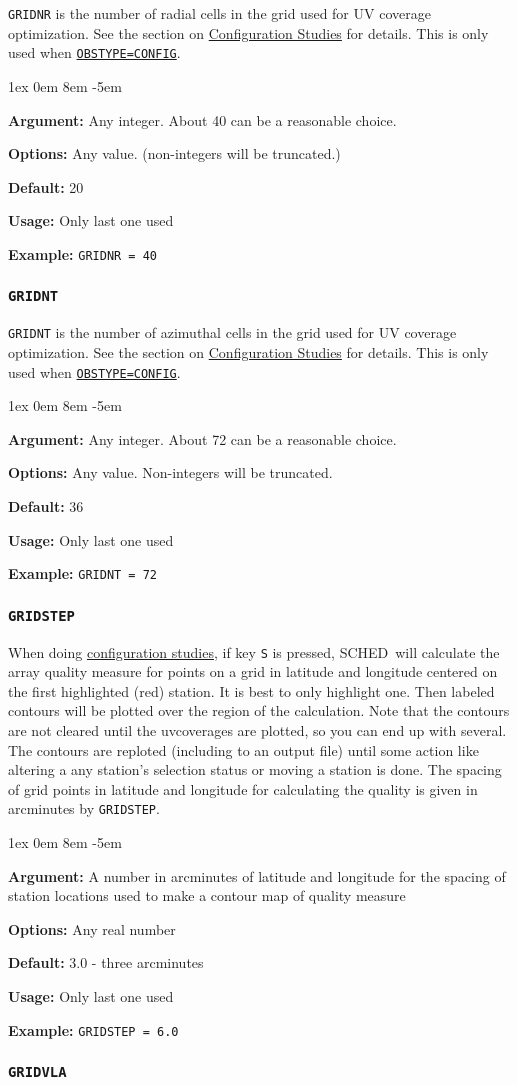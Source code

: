 \documentclass{report}
\newcommand{\schedb}{{\sc SCHED~}}
\newcommand{\rcwbox}[5]{
  \begin{list}{}{\parsep 1ex  \itemsep 0em
                 \leftmargin 8em  \itemindent -5em }
    \item {\bf Argument:} #1
    \item {\bf Options:}  #2
    \item {\bf Default:}  #3
    \item {\bf Usage:}    #4
    \item {\bf Example:}  #5
  \end{list}
}
\begin{document}
{\tt GRIDNR} is the number of radial cells in the grid used for UV
coverage optimization.  See the section on 
{\hyperref[SEC:CONFIG]{Configuration Studies}}
for details. This is only used when
{\hyperref[MP:OBSTYPE]{{\tt OBSTYPE=CONFIG}}}.

\rcwbox
{Any integer.  About 40 can be a reasonable choice.}
{Any value. (non-integers will be truncated.)}
{20}
{Only last one used}
{{\tt GRIDNR = 40}}

\subsubsection{\label{MP:GRIDNT}{\tt GRIDNT}}

{\tt GRIDNT} is the number of azimuthal cells in the grid used for UV
coverage optimization.  See the section on 
{\hyperref[SEC:CONFIG]{Configuration Studies}}
for details.  This is only used when
{\hyperref[MP:OBSTYPE]{{\tt OBSTYPE=CONFIG}}}.

\rcwbox
{Any integer.  About 72 can be a reasonable choice.}
{Any value. Non-integers will be truncated.}
{36}
{Only last one used}
{{\tt GRIDNT = 72}}

\subsubsection{\label{MP:GRIDSTEP}{\tt GRIDSTEP}}

When doing 
{\hyperref[SEC:CONFIG]{configuration studies}}, if key {\tt S}
is pressed, \schedb will calculate the array quality measure for
points on a grid in latitude and longitude centered on the first
highlighted (red) station.  It is best to only highlight one.  Then
labeled contours will be plotted over the region of the calculation.
Note that the contours are not cleared until the uvcoverages are
plotted, so you can end up with several.  The contours are reploted
(including to an output file) until some action like altering a any
station's selection status or moving a station is done.  The spacing
of grid points in latitude and longitude for calculating the quality
is given in arcminutes by {\tt GRIDSTEP}.

\rcwbox
{A number in arcminutes of latitude and longitude for the spacing of
station locations used to make a contour map of quality measure}
{Any real number}
{3.0 - three arcminutes}
{Only last one used}
{{\tt GRIDSTEP = 6.0}}

\subsubsection{\label{MP:GRIDVLA}{\tt GRIDVLA}}
\end{document}
